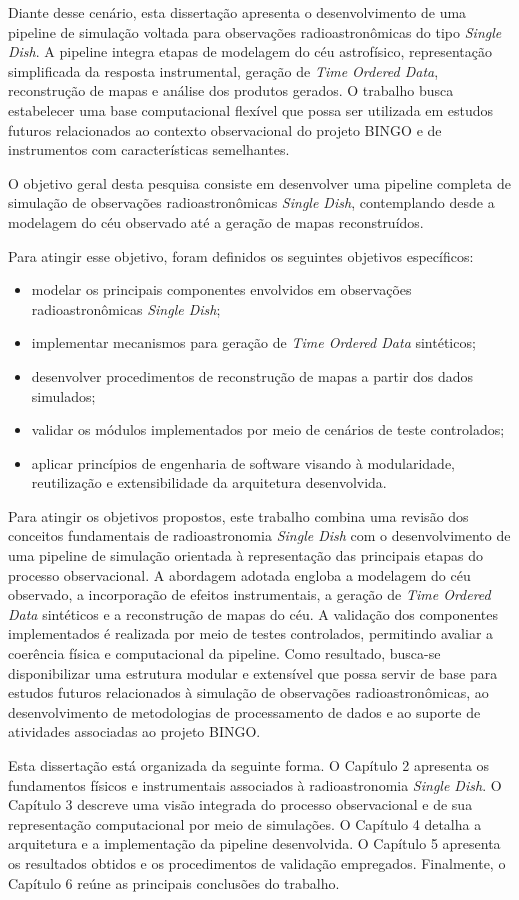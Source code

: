 Diante desse cenário, esta dissertação apresenta o desenvolvimento de uma pipeline de simulação voltada para observações radioastronômicas do tipo \textit{Single Dish}. A pipeline integra etapas de modelagem do céu astrofísico, representação simplificada da resposta instrumental, geração de \textit{Time Ordered Data}, reconstrução de mapas e análise dos produtos gerados. O trabalho busca estabelecer uma base computacional flexível que possa ser utilizada em estudos futuros relacionados ao contexto observacional do projeto BINGO e de instrumentos com características semelhantes.

O objetivo geral desta pesquisa consiste em desenvolver uma pipeline completa de simulação de observações radioastronômicas \textit{Single Dish}, contemplando desde a modelagem do céu observado até a geração de mapas reconstruídos.

Para atingir esse objetivo, foram definidos os seguintes objetivos específicos:

\begin{itemize}
\item modelar os principais componentes envolvidos em observações radioastronômicas \textit{Single Dish};
\item implementar mecanismos para geração de \textit{Time Ordered Data} sintéticos;
\item desenvolver procedimentos de reconstrução de mapas a partir dos dados simulados;
\item validar os módulos implementados por meio de cenários de teste controlados;
\item aplicar princípios de engenharia de software visando à modularidade, reutilização e extensibilidade da arquitetura desenvolvida.
\end{itemize}

Para atingir os objetivos propostos, este trabalho combina uma revisão dos conceitos fundamentais de radioastronomia \textit{Single Dish} com o desenvolvimento de uma pipeline de simulação orientada à representação das principais etapas do processo observacional. A abordagem adotada engloba a modelagem do céu observado, a incorporação de efeitos instrumentais, a geração de \textit{Time Ordered Data} sintéticos e a reconstrução de mapas do céu. A validação dos componentes implementados é realizada por meio de testes controlados, permitindo avaliar a coerência física e computacional da pipeline. Como resultado, busca-se disponibilizar uma estrutura modular e extensível que possa servir de base para estudos futuros relacionados à simulação de observações radioastronômicas, ao desenvolvimento de metodologias de processamento de dados e ao suporte de atividades associadas ao projeto BINGO.

Esta dissertação está organizada da seguinte forma. O Capítulo 2 apresenta os fundamentos físicos e instrumentais associados à radioastronomia \textit{Single Dish}. O Capítulo 3 descreve uma visão integrada do processo observacional e de sua representação computacional por meio de simulações. O Capítulo 4 detalha a arquitetura e a implementação da pipeline desenvolvida. O Capítulo 5 apresenta os resultados obtidos e os procedimentos de validação empregados. Finalmente, o Capítulo 6 reúne as principais conclusões do trabalho.
